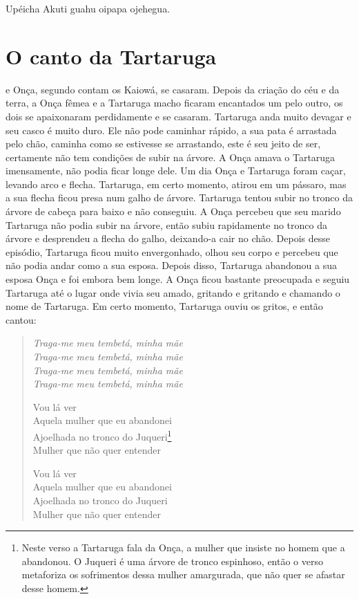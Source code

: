 Upéicha Akuti guahu oipapa ojehegua.

\chapter{O canto da Tartaruga}

 e Onça, segundo contam os Kaiowá, se casaram. Depois da
criação do céu e da terra, a Onça fêmea e a Tartaruga macho ficaram
encantados um pelo outro, os dois se apaixonaram perdidamente e se
casaram. Tartaruga anda muito devagar e seu casco é muito duro. Ele não
pode caminhar rápido, a sua pata é arrastada pelo chão, caminha como se
estivesse se arrastando, este é seu jeito de ser, certamente não tem
condições de subir na árvore. A Onça amava o Tartaruga imensamente, não
podia ficar longe dele. Um dia Onça e Tartaruga foram caçar, levando
arco e flecha. Tartaruga, em certo momento, atirou em um pássaro, mas a
sua flecha ficou presa num galho de árvore. Tartaruga tentou subir no
tronco da árvore de cabeça para baixo e não conseguiu. A Onça percebeu
que seu marido Tartaruga não podia subir na árvore, então subiu
rapidamente no tronco da árvore e desprendeu a flecha do galho,
deixando-a cair no chão. Depois desse episódio, Tartaruga ficou muito
envergonhado, olhou seu corpo e percebeu que não podia andar como a sua
esposa. Depois disso, Tartaruga abandonou a sua esposa Onça e foi embora
bem longe. A Onça ficou bastante preocupada e seguiu Tartaruga até o
lugar onde vivia seu amado, gritando e gritando e chamando o nome de
Tartaruga. Em certo momento, Tartaruga ouviu os gritos, e então cantou:

\begin{verse}
\itshape
Traga-me meu \emph{tembetá}, minha mãe\\
Traga-me meu \emph{tembetá}, minha mãe\\
Traga-me meu \emph{tembetá}, minha mãe\\
Traga-me meu \emph{tembetá}, minha mãe

\pagebreak
Vou lá ver\\
Aquela mulher que eu abandonei\\
Ajoelhada no tronco do Juqueri\footnote{Neste verso a Tartaruga fala da Onça, a mulher que insiste no homem que a abandonou. O Juqueri é uma árvore de tronco espinhoso,
  então o verso metaforiza os sofrimentos dessa mulher amargurada, que
  não quer se afastar desse homem.}\\
Mulher que não quer entender

Vou lá ver\\
Aquela mulher que eu abandonei\\
Ajoelhada no tronco do Juqueri\\
Mulher que não quer entender
\end{verse}

